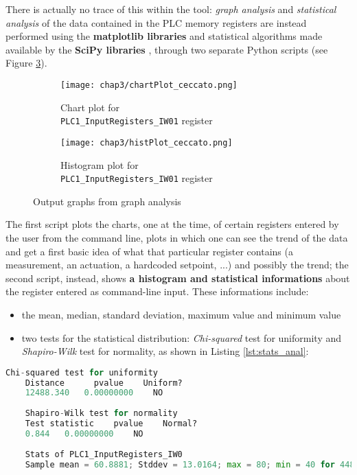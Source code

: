 \bigskip
There is actually no trace of this within the tool: \textit{graph analysis} and \textit{statistical analysis} of the data contained in the PLC memory registers are instead performed using the \textbf{matplotlib libraries} and statistical algorithms made available by the \textbf{SciPy libraries} \cite{scipy}, through two separate Python scripts (see Figure \ref{fig:ceccato_graphs}).

\begin{figure}[ht]
	\centering
	\begin{subfigure}{0.48\textwidth}
		\texttt{[image: chap3/chartPlot\_ceccato.png]}
		\caption{Chart plot for\\ \textnormal{\texttt{PLC1\_InputRegisters\_IW01}} register}
		\label{subfig:chart_plot_ceccato}
	\end{subfigure}
	\hfill
	\begin{subfigure}{0.48\textwidth}
		\texttt{[image: chap3/histPlot\_ceccato.png]}
		\caption{Histogram plot for\\ \textnormal{\texttt{PLC1\_InputRegisters\_IW01}} register}
		\label{subfig:hist_plot_ceccato}
	\end{subfigure}
	\caption{Output graphs from graph analysis}
	\label{fig:ceccato_graphs}
\end{figure}

The first script plots the charts, one at the time, of certain registers entered by the user from the command line, plots in which one can see the trend of the data and get a first basic idea of what that particular register contains (a measurement, an actuation, a hardcoded setpoint, ...) and possibly the trend; the second script, instead, shows \textbf{a histogram and statistical informations} about the register entered as command-line input. These informations include:

\begin{itemize}
	\item the mean, median, standard deviation, maximum value and minimum value
	
	\item two tests for the statistical distribution: \textit{Chi-squared} test for uniformity and \textit{Shapiro-Wilk} test for normality, as shown in Listing \ref{lst:stats_anal}:

\end{itemize}

\begin{lstlisting}[language=Python,numbers=none,caption={Statistical data for \textnormal{\texttt{PLC1\_InputRegisters\_IW0}} register},label=lst:stats_anal]
	Chi-squared test for uniformity
	Distance      pvalue    Uniform?
	12488.340   0.00000000    NO    
	
	Shapiro-Wilk test for normality
	Test statistic    pvalue    Normal? 
	0.844   0.00000000    NO    
	
	Stats of PLC1_InputRegisters_IW0
	Sample mean = 60.8881; Stddev = 13.0164; max = 80; min = 40 for 4488 values
\end{lstlisting}

